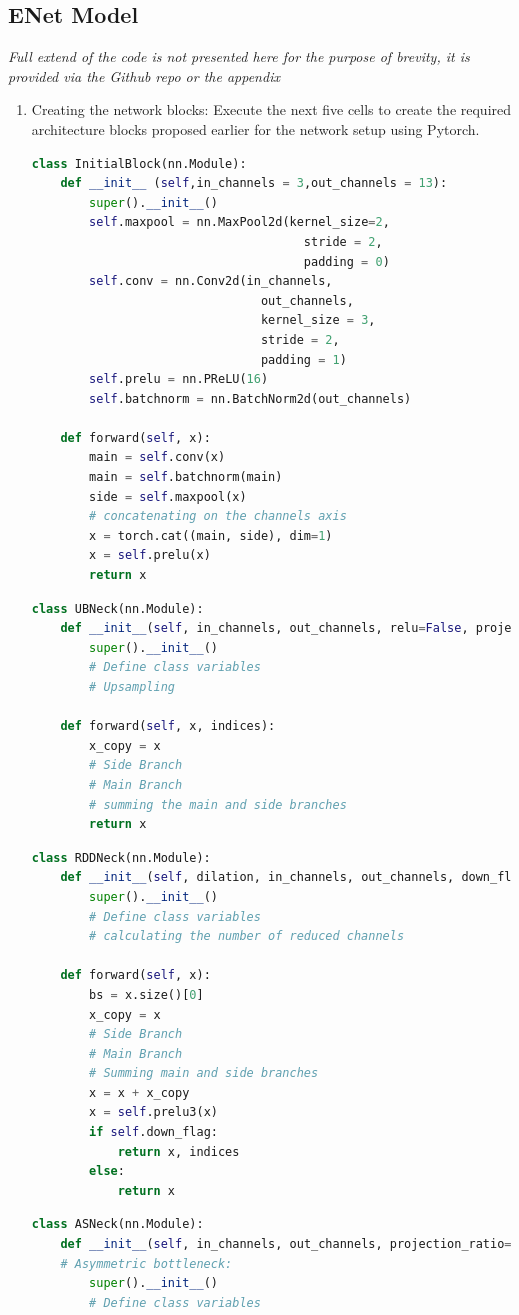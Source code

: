 \subsection*{ENet Model}
\textit{Full extend of the code is not presented here for the purpose of brevity, it is provided via the Github repo or the appendix}
\begin{enumerate}
    \item Creating the network blocks: Execute the next five cells to create the required architecture blocks proposed earlier for the network setup using Pytorch.
          \begin{lstlisting}[language=Python]
class InitialBlock(nn.Module):
    def __init__ (self,in_channels = 3,out_channels = 13):
        super().__init__()
        self.maxpool = nn.MaxPool2d(kernel_size=2,
                                      stride = 2,
                                      padding = 0)
        self.conv = nn.Conv2d(in_channels,
                                out_channels,
                                kernel_size = 3,
                                stride = 2,
                                padding = 1)
        self.prelu = nn.PReLU(16)
        self.batchnorm = nn.BatchNorm2d(out_channels)
        
    def forward(self, x):
        main = self.conv(x)
        main = self.batchnorm(main)
        side = self.maxpool(x)
        # concatenating on the channels axis
        x = torch.cat((main, side), dim=1)
        x = self.prelu(x)
        return x
        \end{lstlisting}
          \begin{lstlisting}[language=Python]
class UBNeck(nn.Module):
    def __init__(self, in_channels, out_channels, relu=False, projection_ratio=4):
        super().__init__()
        # Define class variables
        # Upsampling

    def forward(self, x, indices):
        x_copy = x
        # Side Branch
        # Main Branch
        # summing the main and side branches
        return x
        \end{lstlisting}
          \begin{lstlisting}[language=Python]
class RDDNeck(nn.Module):
    def __init__(self, dilation, in_channels, out_channels, down_flag, relu=False, projection_ratio=4, p=0.1):
        super().__init__()
        # Define class variables
        # calculating the number of reduced channels

    def forward(self, x):
        bs = x.size()[0]
        x_copy = x
        # Side Branch
        # Main Branch
        # Summing main and side branches
        x = x + x_copy
        x = self.prelu3(x)
        if self.down_flag:
            return x, indices
        else:
            return x
        \end{lstlisting}
          \begin{lstlisting}[language=Python]
class ASNeck(nn.Module):
    def __init__(self, in_channels, out_channels, projection_ratio=4):
    # Asymmetric bottleneck:
        super().__init__()
        # Define class variables


\end{lstlisting}
\end{enumerate}
